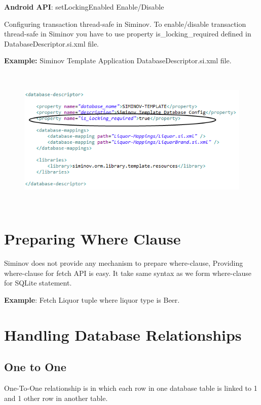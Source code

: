 	\par
	\textbf{Android API}: setLockingEnabled Enable/Disable
		

Configuring transaction thread-safe in Siminov. To enable/disable transaction thread-safe in Siminov you have to use property is\_locking\_required defined in DatabaseDescriptor.si.xml file.

		\par
		\textbf{Example:} Siminov Template Application DatabaseDescriptor.si.xml file.
		\begin{figure}[htbp]
			\centering
				\includegraphics[height=7cm]{Resources/siminov_hybrid_template_application_is_locking_enable_example.png}
		\end{figure}


\section{Preparing Where Clause}
Siminov does not provide any mechanism to prepare where-clause, Providing where-clause for fetch API is easy. It take same syntax as we form where-clause for SQLite statement.

\textbf{Example}: Fetch Liquor tuple where liquor type is Beer.
	
	


\section{Handling Database Relationships}

	\subsection{One to One}
	One-To-One relationship is in which each row in one database table is linked to 1 and 1 other row in another table.

